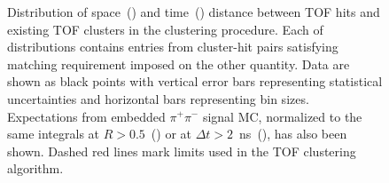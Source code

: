 \begin{figure}[ht!]
{\begin{subfigure}[b]{\linewidth}{
                }
  \end{subfigure}
}%
\caption[Distribution of space and time distance between TOF hits and existing TOF clusters.]{Distribution of space~() and time~() distance between TOF hits and existing TOF clusters in the clustering procedure. Each of distributions contains entries from cluster-hit pairs satisfying matching requirement imposed on the other quantity. Data are shown as black points with vertical error bars representing statistical uncertainties and horizontal bars representing bin sizes. Expectations from embedded $\pi^{+}\pi^{-}$ signal MC, normalized to the same integrals at $R>0.5$~() or at $\Delta t>2$~ns~(), has also been shown. Dashed red lines mark limits used in the TOF clustering algorithm.}\label{fig:TofClusterHitDistance}
\end{figure}%



